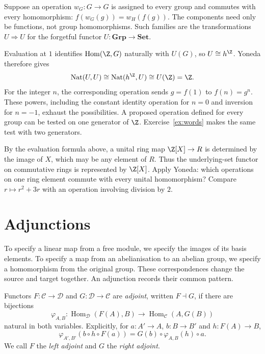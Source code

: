 \begin{example}\label{ex:natops}
Suppose an operation $w_G:G\to G$ is assigned to every group and commutes with every homomorphism: $f(w_G(g))=w_H(f(g))$. The components need only be functions, not group homomorphisms. Such families are the transformations $U\Rightarrow U$ for the forgetful functor $U:\mathbf{Grp}\to\mathbf{Set}$.

Evaluation at $1$ identifies $\operatorname{Hom}(\Z,G)$ naturally with $U(G)$, so $U\cong h^{\Z}$. Yoneda therefore gives
\[
\operatorname{Nat}(U,U)\cong\operatorname{Nat}(h^{\Z},U)\cong U(\Z)=\Z.
\]
For the integer $n$, the corresponding operation sends $g=f(1)$ to $f(n)=g^n$. These powers, including the constant identity operation for $n=0$ and inversion for $n=-1$, exhaust the possibilities. A proposed operation defined for every group can be tested on one generator of $\Z$. Exercise~\ref{ex:words} makes the same test with two generators.
\end{example}

\begin{think}
By the evaluation formula above, a unital ring map $\Z[X]\to R$ is determined by the image of $X$, which may be any element of $R$. Thus the underlying-set functor on commutative rings is represented by $\Z[X]$. Apply Yoneda: which operations on one ring element commute with every unital homomorphism? Compare $r\mapsto r^2+3r$ with an operation involving division by $2$.
\end{think}

\section{Adjunctions}

To specify a linear map from a free module, we specify the images of its basis elements. To specify a map from an abelianisation to an abelian group, we specify a homomorphism from the original group. These correspondences change the source and target together. An adjunction records their common pattern.

\begin{definition}\label{def:adjunction}
Functors $F:\mathcal C\to\mathcal D$ and $G:\mathcal D\to\mathcal C$ are \emph{adjoint}, written $F\dashv G$, if there are bijections
\[
\varphi_{A,B}:\operatorname{Hom}_{\mathcal D}(F(A),B)
 \longrightarrow\operatorname{Hom}_{\mathcal C}(A,G(B))
\]
natural in both variables. Explicitly, for $a:A'\to A$, $b:B\to B'$ and $h:F(A)\to B$,
\[
\varphi_{A',B'}(b\circ h\circ F(a))
 =G(b)\circ\varphi_{A,B}(h)\circ a.
\]
We call $F$ the \emph{left adjoint} and $G$ the \emph{right adjoint}.
\end{definition}

